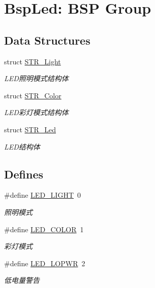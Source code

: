 \hypertarget{group___l_e_d}{\section{\-Bsp\-Led\-: \-B\-S\-P \-Group}
\label{group___l_e_d}
}
\subsection*{\-Data \-Structures}
\begin{DoxyCompactItemize}
\item 
struct \hyperlink{struct_s_t_r___light}{\-S\-T\-R\-\_\-\-Light}
\begin{DoxyCompactList}\small\item\em \-L\-E\-D照明模式结构体 \end{DoxyCompactList}\item 
struct \hyperlink{struct_s_t_r___color}{\-S\-T\-R\-\_\-\-Color}
\begin{DoxyCompactList}\small\item\em \-L\-E\-D彩灯模式结构体 \end{DoxyCompactList}\item 
struct \hyperlink{struct_s_t_r___led}{\-S\-T\-R\-\_\-\-Led}
\begin{DoxyCompactList}\small\item\em \-L\-E\-D结构体 \end{DoxyCompactList}\end{DoxyCompactItemize}
\subsection*{\-Defines}
\begin{DoxyCompactItemize}
\item 
\hypertarget{group___l_e_d_ga2bb5240f10b359f924e69d10d1accd07}{\#define \hyperlink{group___l_e_d_ga2bb5240f10b359f924e69d10d1accd07}{\-L\-E\-D\-\_\-\-L\-I\-G\-H\-T}~0}\label{group___l_e_d_ga2bb5240f10b359f924e69d10d1accd07}

\begin{DoxyCompactList}\small\item\em 照明模式 \end{DoxyCompactList}\item 
\hypertarget{group___l_e_d_ga1a390ed4322d9bfdba9add7bba7a0c8d}{\#define \hyperlink{group___l_e_d_ga1a390ed4322d9bfdba9add7bba7a0c8d}{\-L\-E\-D\-\_\-\-C\-O\-L\-O\-R}~1}\label{group___l_e_d_ga1a390ed4322d9bfdba9add7bba7a0c8d}

\begin{DoxyCompactList}\small\item\em 彩灯模式 \end{DoxyCompactList}\item 
\hypertarget{group___l_e_d_ga9be8a14dcc537a96262bfbf707c8c7f2}{\#define \hyperlink{group___l_e_d_ga9be8a14dcc537a96262bfbf707c8c7f2}{\-L\-E\-D\-\_\-\-L\-O\-P\-W\-R}~2}\label{group___l_e_d_ga9be8a14dcc537a96262bfbf707c8c7f2}

\begin{DoxyCompactList}\small\item\em 低电量警告 \end{DoxyCompactList}\end{DoxyCompactItemize}
